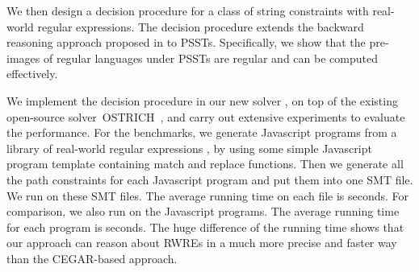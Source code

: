 We then design a decision procedure for a class of string constraints with real-world regular expressions. The decision procedure extends the backward reasoning approach proposed in \cite{CHL+19} to PSSTs. Specifically, we show that the pre-images of regular languages under PSSTs are regular and can be computed effectively. 

We implement the decision procedure in our new solver \ostrich,
on top of the existing open-source solver~OSTRICH~\cite{CHL+19},
 and carry out extensive experiments to evaluate the performance. For the benchmarks, we generate  Javascript programs from a library of real-world regular expressions \cite{DMC+19}, by using some simple Javascript program template containing match and replace functions.  Then we generate all the path constraints for each Javascript program and put them into one SMT file. We run {\ostrich} on these SMT files. The average running time on each file is  seconds. For comparison, we also run \expose{} on the Javascript programs. The average running time for each program is  seconds. The huge difference of the running time shows that our approach can reason about RWREs in a much more precise and faster way than the CEGAR-based approach.


